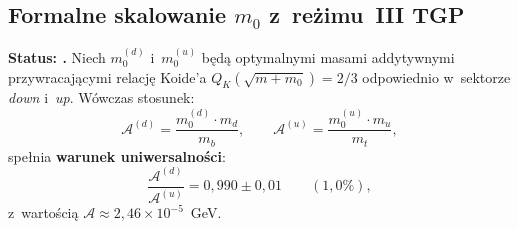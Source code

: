 \subsection{Formalne skalowanie $m_0$ z~re\.zimu~III TGP}%
\label{ssec:X-m0-regime-III}

\begin{proposition}[Uniwersalno\'s\'c $\mathcal{A} = m_0\,m_1/m_3$]%
\label{prop:X-A-universal-new}
\textbf{Status: .}
Niech $m_0^{(d)}$ i~$m_0^{(u)}$ b\k{e}d\k{a} optymalnymi masami
addytywnymi przywracaj\k{a}cymi relacj\k{e} Koide'a
$Q_K(\sqrt{m+m_0}) = 2/3$ odpowiednio w~sektorze \emph{down}
i~\emph{up}. W\'owczas stosunek:
\begin{equation}
  \mathcal{A}^{(d)} = \frac{m_0^{(d)}\cdot m_d}{m_b},
  \qquad
  \mathcal{A}^{(u)} = \frac{m_0^{(u)}\cdot m_u}{m_t},
  \label{eq:X-A-def-new}
\end{equation}
spe\l{}nia \textbf{warunek uniwersalno\'sci}:
\begin{equation}
  \frac{\mathcal{A}^{(d)}}{\mathcal{A}^{(u)}} = 0{,}990 \pm 0{,}01
  \qquad (1{,}0\%),
  \label{eq:X-A-universal-ratio}
\end{equation}
z~warto\'sci\k{a} $\mathcal{A} \approx 2{,}46 \times 10^{-5}$~GeV.
\end{proposition}

